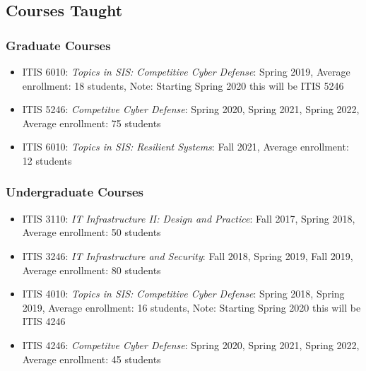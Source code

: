 
\hypertarget{courses}{%
\subsection{Courses Taught}\label{courses}}

\hypertarget{grad-courses}{%
\subsubsection{Graduate Courses}\label{grad-courses}}
\begin{itemize}
\tightlist
\item
  ITIS 6010: \emph{Topics in SIS: Competitive Cyber Defense}: Spring
  2019, Average enrollment: 18 students, Note: Starting Spring 2020 this will be ITIS 5246
\item
  ITIS 5246: \emph{Competitve Cyber Defense}: Spring 2020, Spring 2021, Spring 2022, Average enrollment: 75 students
\item
  ITIS 6010: \emph{Topics in SIS: Resilient Systems}: Fall 2021, Average enrollment: 12 students
\end{itemize}

\hypertarget{undergrad-courses}{%
\subsubsection{Undergraduate Courses}\label{undergrad-courses}}
\begin{itemize}
\tightlist
\item
  ITIS 3110: \emph{IT Infrastructure II: Design and Practice}: Fall
  2017, Spring 2018, Average enrollment: 50 students
\item
  ITIS 3246: \emph{IT Infrastructure and Security}: Fall 2018, Spring
  2019, Fall 2019, Average enrollment: 80 students
\item
  ITIS 4010: \emph{Topics in SIS: Competitive Cyber Defense}: Spring
  2018, Spring 2019, Average enrollment: 16 students, Note: Starting Spring 2020 this will be ITIS 4246
\item
  ITIS 4246: \emph{Competitve Cyber Defense}: Spring 2020, Spring 2021, Spring 2022, Average enrollment: 45 students
\end{itemize}
